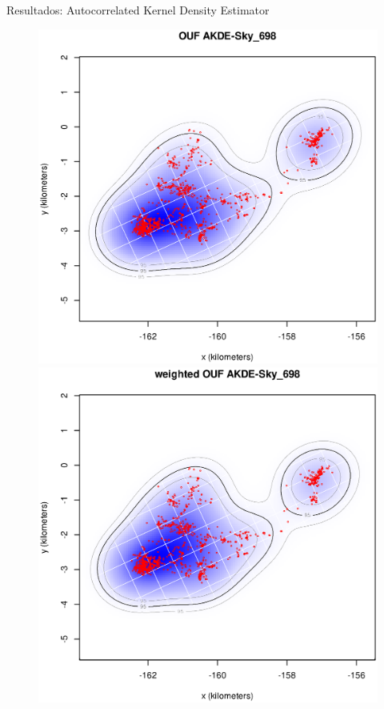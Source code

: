 \documentclass[11pt]{beamer}
\begin{document}
\begin{frame}{Resultados: Autocorrelated Kernel Density Estimator}
\begin{figure}
            \includegraphics[scale=0.2]{images/ouf_kde_Sky_698}
            \includegraphics[scale=0.2]{images/w_ouf_kde_Sky_698}
        \end{figure}
\end{frame}
\end{document}
